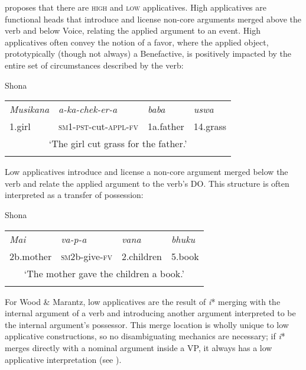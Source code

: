 \documentclass[output=paper]{langscibook}
\begin{document}
\citet{Pylkkänen2008} proposes that there are \textsc{high} and \textsc{low} applicatives. High applicatives are functional heads that introduce and license non-core arguments merged above the verb and below Voice, relating the applied argument to an event. High applicatives often convey the notion of a favor, where the applied object, prototypically (though not always) a Benefactive, is positively impacted by the entire set of circumstances described by the verb:


\ea\label{ex:wechsler:12}
Shona\\

\tablefirsthead{}

\tabletail{}
\tablelasttail{}
\begin{tabularx}{\textwidth}{XXXX}
\lsptoprule
{\itshape Musikana} & \textit{a-ka-chek-er-a}                  & {\itshape baba}  & {\itshape uswa}\\
1.girl    & \textsc{sm1}{}-\textsc{pst}{}-cut-\textsc{appl-fv}  & 1a.father & 14.grass\\
\multicolumn{4}{c}{‘The girl cut grass for the father.’}\\
\lspbottomrule
\end{tabularx}
\z

Low applicatives introduce and license a non-core argument merged below the verb and relate the applied argument to the verb’s DO. This structure is often interpreted as a transfer of possession: 


\ea\label{ex:wechsler:13}
Shona\\

\tablefirsthead{}

\tabletail{}
\tablelasttail{}
\begin{tabularx}{\textwidth}{XXXX}
\lsptoprule
{\itshape Mai} & \textit{va-p-a}                 & {\itshape vana}  & {\itshape bhuku}\\
2b.mother & \textsc{sm2}b-give-\textsc{fv} & 2.children & 5.book\\
\multicolumn{4}{c}{‘The mother gave the children a book.’}\\
\lspbottomrule
\end{tabularx}

For Wood \& Marantz, low applicatives are the result of \textit{i}* merging with the internal argument of a verb and introducing another argument interpreted to be the internal argument’s possessor. This merge location is wholly unique to low applicative constructions, so no disambiguating mechanics are necessary; if \textit{i}* merges directly with a nominal argument inside a VP, it always has a low applicative interpretation (see ). 
\end{document}

